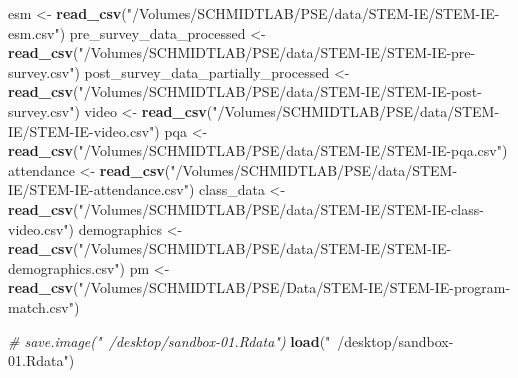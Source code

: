 \documentclass[]{msu-thesis}
\newenvironment{Shaded}{\begin{snugshade}}{\end{snugshade}}
\newcommand{\KeywordTok}[1]{\textcolor[rgb]{0.13,0.29,0.53}{\textbf{#1}}}
\newcommand{\StringTok}[1]{\textcolor[rgb]{0.31,0.60,0.02}{#1}}
\newcommand{\CommentTok}[1]{\textcolor[rgb]{0.56,0.35,0.01}{\textit{#1}}}
\newcommand{\NormalTok}[1]{#1}
\theoremstyle{definition}
\theoremstyle{definition}
\theoremstyle{definition}
\theoremstyle{remark}
\begin{document}
\begin{Shaded}
\begin{Highlighting}[]
\NormalTok{esm <-}\StringTok{ }\KeywordTok{read_csv}\NormalTok{(}\StringTok{"/Volumes/SCHMIDTLAB/PSE/data/STEM-IE/STEM-IE-esm.csv"}\NormalTok{)}
\NormalTok{pre_survey_data_processed <-}\StringTok{ }\KeywordTok{read_csv}\NormalTok{(}\StringTok{"/Volumes/SCHMIDTLAB/PSE/data/STEM-IE/STEM-IE-pre-survey.csv"}\NormalTok{)}
\NormalTok{post_survey_data_partially_processed <-}\StringTok{ }\KeywordTok{read_csv}\NormalTok{(}\StringTok{"/Volumes/SCHMIDTLAB/PSE/data/STEM-IE/STEM-IE-post-survey.csv"}\NormalTok{)}
\NormalTok{video <-}\StringTok{ }\KeywordTok{read_csv}\NormalTok{(}\StringTok{"/Volumes/SCHMIDTLAB/PSE/data/STEM-IE/STEM-IE-video.csv"}\NormalTok{)}
\NormalTok{pqa <-}\StringTok{ }\KeywordTok{read_csv}\NormalTok{(}\StringTok{"/Volumes/SCHMIDTLAB/PSE/data/STEM-IE/STEM-IE-pqa.csv"}\NormalTok{)}
\NormalTok{attendance <-}\StringTok{ }\KeywordTok{read_csv}\NormalTok{(}\StringTok{"/Volumes/SCHMIDTLAB/PSE/data/STEM-IE/STEM-IE-attendance.csv"}\NormalTok{)}
\NormalTok{class_data <-}\StringTok{ }\KeywordTok{read_csv}\NormalTok{(}\StringTok{"/Volumes/SCHMIDTLAB/PSE/data/STEM-IE/STEM-IE-class-video.csv"}\NormalTok{)}
\NormalTok{demographics <-}\StringTok{ }\KeywordTok{read_csv}\NormalTok{(}\StringTok{"/Volumes/SCHMIDTLAB/PSE/data/STEM-IE/STEM-IE-demographics.csv"}\NormalTok{)}
\NormalTok{pm <-}\StringTok{ }\KeywordTok{read_csv}\NormalTok{(}\StringTok{"/Volumes/SCHMIDTLAB/PSE/Data/STEM-IE/STEM-IE-program-match.csv"}\NormalTok{)}
\end{Highlighting}
\end{Shaded}

\begin{Shaded}
\begin{Highlighting}[]
\CommentTok{# save.image("~/desktop/sandbox-01.Rdata")}
\KeywordTok{load}\NormalTok{(}\StringTok{"~/desktop/sandbox-01.Rdata"}\NormalTok{)}
\end{Highlighting}
\end{Shaded}
\end{document}
